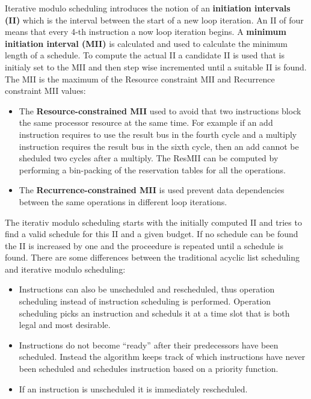 \documentclass[a4paper,10pt]{article}
\begin{document}
Iterative modulo scheduling introduces the notion of an \textbf{initiation intervals (II)} which is the interval between the start of a 
new loop iteration. An II of four means that every 4-th instruction a now loop iteration begins. A \textbf{minimum initiation interval 
(MII)} is calculated and used to calculate the minimum length of a schedule. To compute the actual II a 
candidate II is used that is initialy set to the MII and then step wise incremented until a suitable II is found. The MII is the maximum 
of the Resource constraint MII and Recurrence constraint MII values:

\begin{itemize}
 \item The \textbf{Resource-constrained MII} used to avoid that two instructions block the same processor resource at the same time. For 
       example if an add instruction requires to use the result bus in the fourth cycle and a multiply instruction requires the result bus 
       in the sixth cycle, then an add cannot be sheduled two cycles after a multiply. The ResMII can be computed by performing a
       bin-packing of the reservation tables for all the operations.
 \item The \textbf{Recurrence-constrained MII} is used prevent data dependencies between the same operations in different loop iterations. 
\end{itemize}

The iterativ modulo scheduling starts with the initially computed II and tries to find a valid schedule for this II and a given budget. If
no schedule can be found the II is increased by one and the proceedure is repeated until a schedule is found. There are some differences
between the traditional acyclic list scheduling and iterative modulo scheduling:
\begin{itemize}
 \item Instructions can also be unscheduled and rescheduled, thus operation scheduling instead of instruction scheduling is performed. 
       Operation scheduling picks an instruction and scheduls it at a time slot that is both legal and most desirable.
 \item Instructions do not become ``ready'' after their predecessors have been scheduled. Instead the algorithm keeps track of which 
       instructions have never been scheduled and schedules instruction based on a priority function.
 \item If an instruction is unscheduled it is immediately rescheduled.
\end{itemize}
\end{document}
